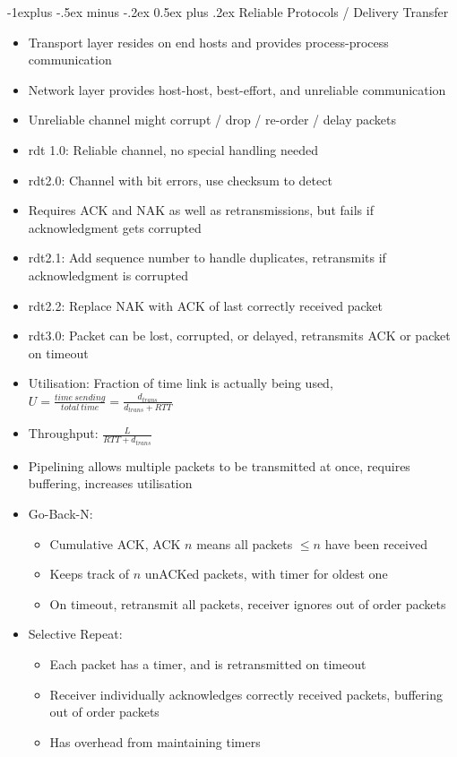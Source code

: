 \documentclass[10pt, landscape]{article}
\makeatletter
\renewcommand{\section}{\@startsection{section}{1}{0mm}%
                                {-1ex plus -.5ex minus -.2ex}%
                                {0.5ex plus .2ex}%
                                {\normalfont\large\bfseries}}
\renewcommand{\section}{\@startsection{section}{2}{0mm}%
                                {-1explus -.5ex minus -.2ex}%
                                {0.5ex plus .2ex}%
                                {\normalfont\normalsize\bfseries}}
\makeatother
\begin{document}
\begin{multicols*}{3}
\section{Reliable Protocols / Delivery Transfer}
\begin{itemize}
    \item Transport layer resides on end hosts and provides process-process communication
    \item Network layer provides host-host, best-effort, and unreliable communication
    \item Unreliable channel might corrupt / drop / re-order / delay packets
    \item rdt 1.0: Reliable channel, no special handling needed
    \item rdt2.0: Channel with bit errors, use checksum to detect
    \item Requires ACK and NAK as well as retransmissions, but fails if acknowledgment gets corrupted
    \item rdt2.1: Add sequence number to handle duplicates, retransmits if acknowledgment is corrupted
    \item rdt2.2: Replace NAK with ACK of last correctly received packet
    \item rdt3.0: Packet can be lost, corrupted, or delayed, retransmits ACK or packet on timeout
    \item Utilisation: Fraction of time link is actually being used, $U=\frac{time \ sending}{total\ time}=\frac{d_{trans}}{d_{trans}+RTT}$
    \item Throughput: $\frac{L}{RTT+d_{trans}}$
    \item Pipelining allows multiple packets to be transmitted at once, requires buffering, increases utilisation
    \item Go-Back-N:
    \begin{itemize}
        \item Cumulative ACK, ACK $n$ means all packets $\leq n$ have been received
        \item Keeps track of $n$ unACKed packets, with timer for oldest one
        \item On timeout, retransmit all packets, receiver ignores out of order packets
    \end{itemize}
    \item Selective Repeat:
    \begin{itemize}
        \item Each packet has a timer, and is retransmitted on timeout
        \item Receiver individually acknowledges correctly received packets, buffering out of order packets
        \item Has overhead from maintaining timers
    \end{itemize}
\end{itemize}


\end{multicols*}
\end{document}
